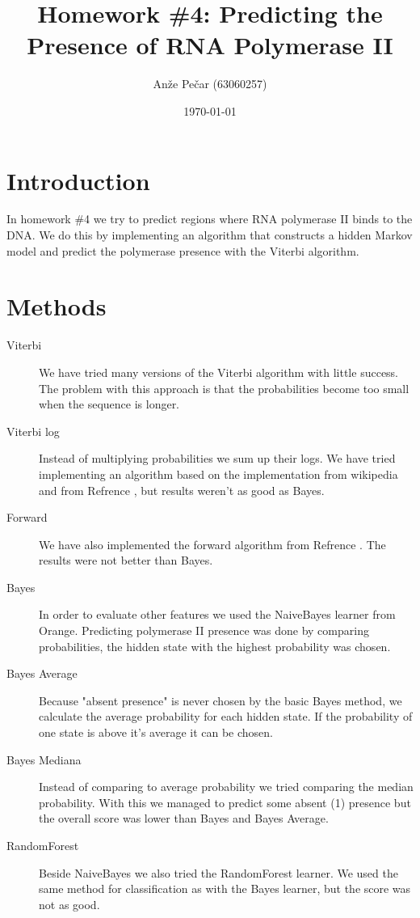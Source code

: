 \documentclass[a4paper,11pt]{article}
\title{Homework \#4: Predicting the Presence of RNA Polymerase II}
\author{Anže Pečar (63060257)}
\date{\today}
\begin{document}
\maketitle

\section{Introduction}

In homework \#4 we try to predict regions where RNA polymerase II binds to the DNA. We do this by implementing an algorithm that constructs a hidden Markov model and predict the polymerase presence with the Viterbi algorithm. 

\section{Methods}

\begin{description}
    \item[Viterbi] We have tried many versions of the Viterbi algorithm with little success. The problem with this approach is that the probabilities become too small when the sequence is longer.
    	\item[Viterbi log] Instead of multiplying probabilities we sum up their logs. We have tried implementing an algorithm based on the implementation from wikipedia and from Refrence \cite{icg}, but results weren't as good as Bayes.
    	\item[Forward] We have also implemented the forward algorithm from Refrence \cite{icg}. The results were not better than Bayes.
    	\item[Bayes] In order to evaluate other features we used the NaiveBayes learner from Orange. Predicting polymerase II presence was done by comparing probabilities, the hidden state with the highest probability was chosen.
    	\item[Bayes Average] Because "absent presence" is never chosen by the basic Bayes method, we calculate the average probability for each hidden state. If the probability of one state is above it's average it can be chosen.   
    	\item[Bayes Mediana] Instead of comparing to average probability we tried comparing the median probability. With this we managed to predict some absent (1) presence but the overall score was lower than Bayes and Bayes Average.
    	\item[RandomForest] Beside NaiveBayes we also tried the RandomForest learner. We used the same method for classification as with the Bayes learner, but the score was not as good.
\end{description}
\end{document}
